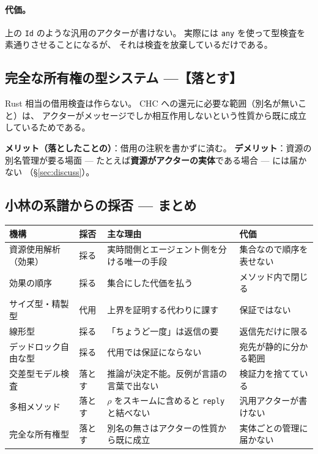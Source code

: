\documentclass[11pt,a4paper]{ltjsarticle}
\theoremstyle{definition}
\theoremstyle{remark}
\begin{document}
\paragraph{代価。}
上の \texttt{Id} のような汎用のアクターが書けない。
実際には \texttt{any} を使って型検査を素通りさせることになるが、
それは検査を放棄しているだけである。

\subsection{完全な所有権の型システム ---【落とす】}


Rust 相当の借用検査は作らない。
CHC への還元に必要な範囲（別名が無いこと）は、
アクターがメッセージでしか相互作用しないという性質から既に成立しているためである。

\textbf{メリット（落としたことの）}：借用の注釈を書かずに済む。
\textbf{デメリット}：資源の別名管理が要る場面 ---
たとえば\textbf{資源がアクターの実体}である場合 --- には届かない
（\S\ref{sec:discuss}）。

\subsection{小林の系譜からの採否 --- まとめ}

\begin{center}
\small
\begin{tabular}{p{}p{}p{}p{}}
\toprule
機構 & 採否 & 主な理由 & 代価 \\
\midrule
資源使用解析（効果） & 採る & 実時間側とエージェント側を分ける唯一の手段 & 集合なので順序を表せない \\
効果の順序 & 採る & 集合にした代価を払う & メソッド内で閉じる \\
サイズ型・精製型 & 代用 & 上界を証明する代わりに課す & 保証ではない \\
線形型 & 採る & 「ちょうど一度」は返信の要 & 返信先だけに限る \\
デッドロック自由な型 & 採る & 代用では保証にならない & 宛先が静的に分かる範囲 \\
\addlinespace
交差型モデル検査 & 落とす & 推論が決定不能。反例が言語の言葉で出ない & 検証力を捨てている \\
多相メソッド & 落とす & $\rho$ をスキームに含めると \texttt{reply} と結べない & 汎用アクターが書けない \\
完全な所有権型 & 落とす & 別名の無さはアクターの性質から既に成立 & 実体ごとの管理に届かない \\
\bottomrule
\end{tabular}
\end{center}
\end{document}
